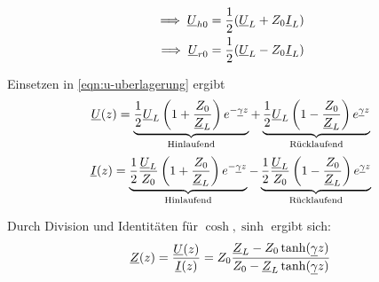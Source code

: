 \begin{align}
    \implies \underline{U}_{h0} &= \frac{1}{2} (\underline{U}_L + Z_0 \underline{I}_L)\\
    \implies \underline{U}_{r0} &= \frac{1}{2} (\underline{U}_L - Z_0 \underline{I}_L)
\end{align}

Einsetzen in \eqref{eqn:u-uberlagerung} ergibt
\begin{equation}
    \underline{U}(z) = \underbrace{ \frac{1}{2} \underline{U}_L \left( 1 + \frac{Z_0}{\underline{Z}_L} \right) e^{-\underline{\gamma} z} }_{\text{Hinlaufend}} + \underbrace{ \frac{1}{2} \underline{U}_L \left( 1 - \frac{Z_0}{\underline{Z}_L} \right) e^{\underline{\gamma} z} }_{\text{Rücklaufend}}
    \label{eqn:u-uberlagerung-z}
\end{equation}
\begin{equation}
    \underline{I}(z) = \underbrace{ \frac{1}{2} \frac{\underline{U}_L}{Z_0} \left( 1 + \frac{Z_0}{\underline{Z}_L} \right) e^{-\underline{\gamma} z} }_{\text{Hinlaufend}} - \underbrace{ \frac{1}{2} \frac{\underline{U}_L}{Z_0} \left( 1 - \frac{Z_0}{\underline{Z}_L} \right) e^{\underline{\gamma} z} }_{\text{Rücklaufend}}
    \label{eqn:i-uberlagerung-z}
\end{equation}

\noindent
Durch Division und Identitäten für $\cosh, \sinh$ ergibt sich:
\begin{equation}
    \underline{Z}(z) = \frac{\underline{U}(z)}{\underline{I}(z)} = Z_0 \frac{\underline{Z}_L-Z_0 \tanh(\underline{\gamma} z)}{Z_0 - \underline{Z}_L \tanh(\underline{\gamma} z)}
\end{equation}

